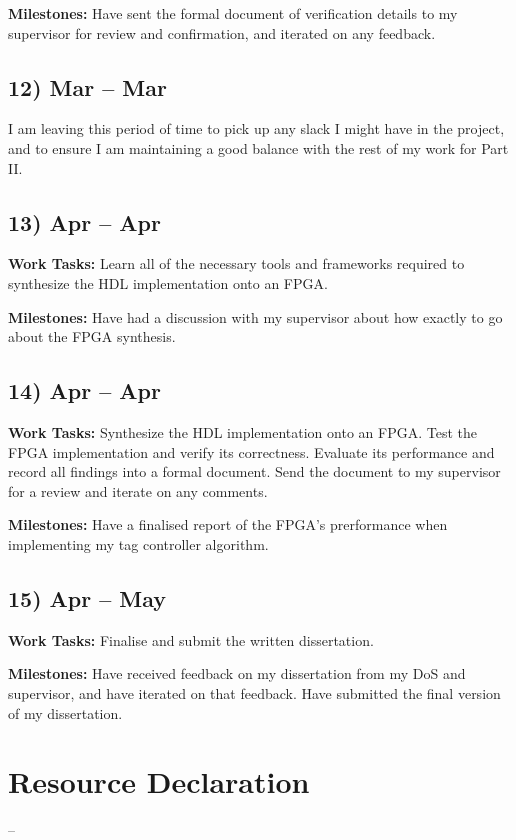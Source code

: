 \documentclass[10pt,a4paper]{article}
\begin{document}
\textbf{Milestones:} Have sent the formal document of verification details to my supervisor for review and confirmation, and iterated on any feedback.

\subsection*{12)  Mar --  Mar}
I am leaving this period of time to pick up any slack I might have in the project, and to ensure I am maintaining a good balance with the rest of my work for Part II.

\subsection*{13)  Apr --  Apr}
\textbf{Work Tasks:} Learn all of the necessary tools and frameworks required to synthesize the HDL implementation onto an FPGA.

\textbf{Milestones:} Have had a discussion with my supervisor about how exactly to go about the FPGA synthesis.

\subsection*{14)  Apr --  Apr}
\textbf{Work Tasks:} Synthesize the HDL implementation onto an FPGA. Test the FPGA implementation and verify its correctness. Evaluate its performance and record all findings into a formal document. Send the document to my supervisor for a review and iterate on any comments.

\textbf{Milestones:} Have a finalised report of the FPGA's prerformance when implementing my tag controller algorithm.

\subsection*{15)  Apr --  May}
\textbf{Work Tasks:} Finalise and submit the written dissertation.

\textbf{Milestones:} Have received feedback on my dissertation from my DoS and supervisor, and have iterated on that feedback. Have submitted the final version of my dissertation.

\section*{Resource Declaration}
--
\end{document}
